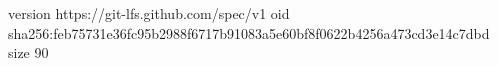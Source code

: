 version https://git-lfs.github.com/spec/v1
oid sha256:feb75731e36fc95b2988f6717b91083a5e60bf8f0622b4256a473cd3e14c7dbd
size 90
